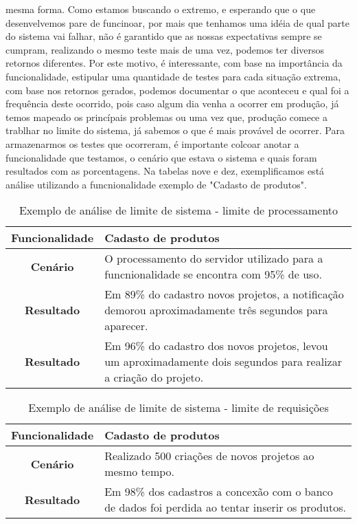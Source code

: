       mesma forma. Como estamos buscando o extremo, e esperando que o que desenvelvemos
      pare de funcinoar, por mais que tenhamos uma idéia de qual parte do sistema
      vai falhar, não é garantido que as nossas expectativas sempre se cumpram,
      realizando o mesmo teste mais de uma vez, podemos ter diversos retornos
      diferentes. Por este motivo, é interessante, com base na importância da
      funcionalidade, estipular uma quantidade de testes para cada situação extrema,
      com base nos retornos gerados, podemos documentar o que aconteceu e qual foi
      a frequência deste ocorrido, pois caso algum dia venha a ocorrer em produção,
      já temos mapeado os princípais problemas ou uma vez que, produção comece a
      trablhar no limite do sistema, já sabemos o que é mais provável de ocorrer.
      Para armazenarmos os testes que ocorreram, é importante colcoar anotar a
      funcionalidade que testamos, o cenário que estava o sistema e quais foram
      resultados com as porcentagens. Na tabelas nove e dez, exemplificamos está análise
      utilizando a funcnionalidade exemplo de "Cadasto de produtos". \newline

      \begin{table}[h!]
        \centering
        \begin{tabular}{|c|p{10cm}|}
          \hline
          \textbf{Funcionalidade} &
          Cadasto de produtos \\ \hline
          \textbf{Cenário} &
          O processamento do servidor utilizado para a funcnionalidade se encontra
          com 95\% de uso. \\ \hline
          \textbf{Resultado} &
          Em 89\% do cadastro novos projetos, a notificação demorou aproximadamente
          três segundos para aparecer. \\ \hline
          \textbf{Resultado} &
          Em 96\% do cadastro dos novos projetos, levou um aproximadamente dois
          segundos para realizar a criação do projeto. \\ \hline
        \end{tabular}
        \caption{Exemplo de análise de limite de sistema - limite de processamento}
        \label{Tabela:9}
      \end{table}

      \begin{table}[h!]
        \centering
        \begin{tabular}{|c|p{10cm}|}
          \hline
          \textbf{Funcionalidade} &
          Cadasto de produtos \\ \hline
          \textbf{Cenário} &
          Realizado 500 criações de novos projetos ao mesmo tempo. \\ \hline
          \textbf{Resultado} &
          Em 98\% dos cadastros a concexão com o banco de dados foi perdida ao tentar
          inserir os produtos. \\ \hline
        \end{tabular}
        \caption{Exemplo de análise de limite de sistema - limite de requisições}
        \label{Tabela:10}
      \end{table}

